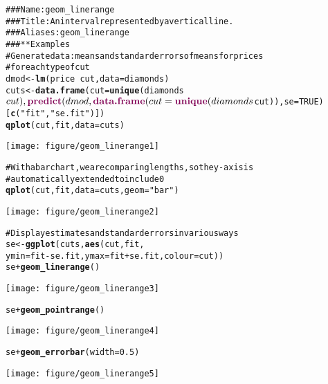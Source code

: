 \documentclass[a4paper,titlepage]{tufte-handout}\usepackage{graphicx, color}
\makeatletter
\def\maxwidth{ %
  \ifdim\Gin@nat@width>\linewidth
    \linewidth
  \else
    \Gin@nat@width
  \fi
}
\newcommand{\hlfunctioncall}[1]{\textcolor[rgb]{0.501960784313725,0,0.329411764705882}{\textbf{#1}}}%
\newcommand{\hlstring}[1]{\textcolor[rgb]{0.6,0.6,1}{#1}}%
\newcommand{\hlcomment}[1]{\textcolor[rgb]{0.180392156862745,0.6,0.341176470588235}{#1}}%
\newenvironment{kframe}{%
 \def\at@end@of@kframe{}%
 \ifinner\ifhmode%
  \def\at@end@of@kframe{\end{minipage}}%
  \begin{minipage}{\columnwidth}%
 \fi\fi%
 \def\FrameCommand##1{\hskip\@totalleftmargin \hskip-\fboxsep
 \colorbox{shadecolor}{##1}\hskip-\fboxsep
     \hskip-\linewidth \hskip-\@totalleftmargin \hskip\columnwidth}%
 \MakeFramed {\advance\hsize-\width
   \@totalleftmargin\z@ \linewidth\hsize
   \@setminipage}}%
 {\par\unskip\endMakeFramed%
 \at@end@of@kframe}
\newenvironment{knitrout}{}{} %
\makeatother
\begin{document}
\begin{knitrout}
\color{fgcolor}\begin{kframe}
\begin{alltt}
\hlcomment{### Name: geom_linerange}
\hlcomment{### Title: An interval represented by a vertical line.}
\hlcomment{### Aliases: geom_linerange}
\hlcomment{### ** Examples}
\hlcomment{# Generate data: means and standard errors of means for prices}
\hlcomment{# for each type of cut}
dmod <- \hlfunctioncall{lm}(price ~ cut, data=diamonds)
cuts <- \hlfunctioncall{data.frame}(cut=\hlfunctioncall{unique}(diamonds$cut), \hlfunctioncall{predict}(dmod, \hlfunctioncall{data.frame}(cut = \hlfunctioncall{unique}(diamonds$cut)), se=TRUE)[\hlfunctioncall{c}(\hlstring{"fit"},\hlstring{"se.fit"})])
\hlfunctioncall{qplot}(cut, fit, data=cuts)
\end{alltt}
\end{kframe}\texttt{[image: figure/geom\_linerange1]} \begin{kframe}\begin{alltt}
\hlcomment{# With a bar chart, we are comparing lengths, so the y-axis is}
\hlcomment{# automatically extended to include 0}
\hlfunctioncall{qplot}(cut, fit, data=cuts, geom=\hlstring{"bar"})
\end{alltt}
\end{kframe}\texttt{[image: figure/geom\_linerange2]} \begin{kframe}\begin{alltt}
\hlcomment{# Display estimates and standard errors in various ways}
se <- \hlfunctioncall{ggplot}(cuts, \hlfunctioncall{aes}(cut, fit,
  ymin = fit - se.fit, ymax=fit + se.fit, colour = cut))
se + \hlfunctioncall{geom_linerange}()
\end{alltt}
\end{kframe}\texttt{[image: figure/geom\_linerange3]} \begin{kframe}\begin{alltt}
se + \hlfunctioncall{geom_pointrange}()
\end{alltt}
\end{kframe}\texttt{[image: figure/geom\_linerange4]} \begin{kframe}\begin{alltt}
se + \hlfunctioncall{geom_errorbar}(width = 0.5)
\end{alltt}
\end{kframe}\texttt{[image: figure/geom\_linerange5]} \begin{kframe}\begin{alltt}

\end{alltt}
\end{kframe}
\end{knitrout}
\end{document}
